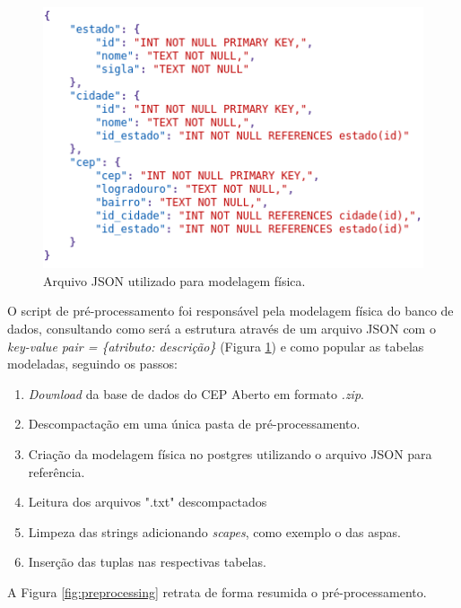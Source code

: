\documentclass[conference]{IEEEtran}
\begin{document}
\begin{figure}[htbp]
\centerline{\includegraphics[scale=0.45]{imgs/struct_json.png}}
\caption{Arquivo JSON utilizado para modelagem física.}
\label{fig:struct_json}
\end{figure}

O script de pré-processamento foi responsável pela modelagem física do banco de dados, consultando como será a estrutura através de um arquivo JSON com o \textit{key-value pair = \{atributo: descrição\}} (Figura \ref{fig:struct_json}) e como popular as tabelas modeladas, seguindo os passos:

\begin{enumerate}
    \item \textit{Download} da base de dados do CEP Aberto em formato \textit{.zip}.
    \item Descompactação em uma única pasta de pré-processamento.
    \item Criação da modelagem física no postgres utilizando o arquivo JSON para referência.
    \item Leitura dos arquivos ".txt" descompactados
    \item Limpeza das strings adicionando \textit{scapes}, como exemplo o das aspas.
    \item Inserção das tuplas nas respectivas tabelas.
\end{enumerate}

A Figura \ref{fig:preprocessing} retrata de forma resumida o pré-processamento.
\end{document}
